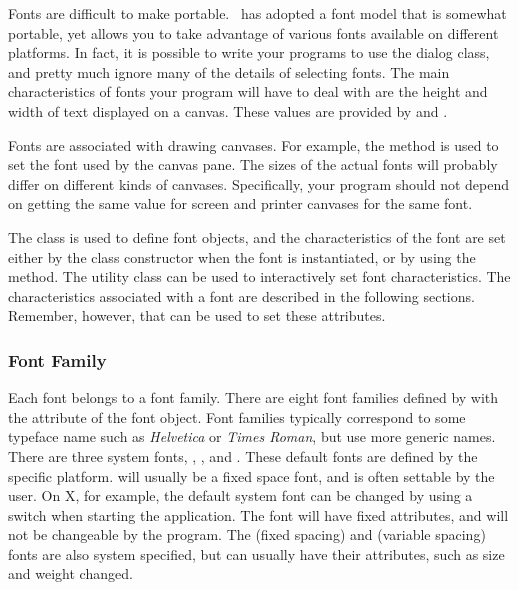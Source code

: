 Fonts are difficult to make portable. \V\ has adopted a font
model that is somewhat portable, yet allows you to take advantage
of various fonts available on different platforms. In fact, it
is possible to write your programs to use the 
dialog class, and pretty much ignore many of the details of
selecting fonts. The main characteristics of fonts your program
will have to deal with are the height and width of text displayed
on a canvas. These values are provided by 
 and .

Fonts are associated with drawing canvases. For example, the
 method is used to set the font used
by the canvas pane. The sizes of the actual fonts will probably
differ on different kinds of canvases. Specifically, your program
should not depend on getting the same  value
for screen and printer canvases for the same font.

The class  is used to define font objects, and the
characteristics of the font are set either by the class
constructor when the font is instantiated, or by using the  
 method. The utility class 
can be used to interactively set font characteristics.  The
characteristics associated with a font are described in the
following sections. Remember, however, that 
can be used to set these attributes.

\subsubsection*{Font Family}

Each font belongs to a font family. There are eight font families
defined by \V\@ with the  attribute of the font object.
Font families typically correspond to some typeface name such
as \emph{Helvetica} or \emph{Times Roman}, but use more generic names.
There are three system fonts, , ,
and . These default fonts are defined by
the specific platform.  will usually be a
fixed space font, and is often settable by the user. On X, for
example, the default system font can be changed by using a
 switch when starting the application. The
 font will have fixed attributes, and will
not be changeable by the program. The 
(fixed spacing) and   (variable spacing)
fonts are also system specified, but can usually have their
attributes, such as size and weight changed.

